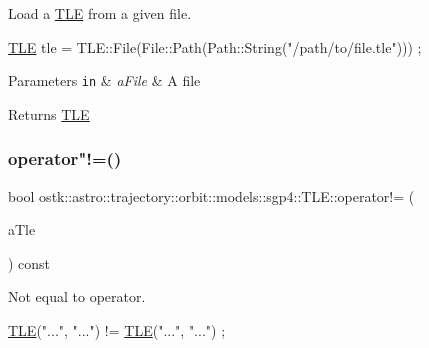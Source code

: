 Load a \hyperlink{classostk_1_1astro_1_1trajectory_1_1orbit_1_1models_1_1sgp4_1_1_t_l_e}{T\+LE} from a given file. 


\begin{DoxyCode}
\hyperlink{classostk_1_1astro_1_1trajectory_1_1orbit_1_1models_1_1sgp4_1_1_t_l_e_a57323db2c24577c2e8ddce79fa776d1e}{TLE} tle = TLE::File(File::Path(Path::String(\textcolor{stringliteral}{"/path/to/file.tle"}))) ;
\end{DoxyCode}



\begin{DoxyParams}[1]{Parameters}
\mbox{\tt in}  & {\em a\+File} & A file \\
\hline
\end{DoxyParams}
\begin{DoxyReturn}{Returns}
\hyperlink{classostk_1_1astro_1_1trajectory_1_1orbit_1_1models_1_1sgp4_1_1_t_l_e}{T\+LE} 
\end{DoxyReturn}
\mbox{\label{classostk_1_1astro_1_1trajectory_1_1orbit_1_1models_1_1sgp4_1_1_t_l_e_a3b15abd9b07fb2a0851b680fe23da8f6}} 
\subsubsection{\texorpdfstring{operator"!=()}{operator!=()}}
{\footnotesize\ttfamily bool ostk\+::astro\+::trajectory\+::orbit\+::models\+::sgp4\+::\+T\+L\+E\+::operator!= (\begin{DoxyParamCaption}\item[{const \hyperlink{classostk_1_1astro_1_1trajectory_1_1orbit_1_1models_1_1sgp4_1_1_t_l_e}{T\+LE} \&}]{a\+Tle }\end{DoxyParamCaption}) const}



Not equal to operator. 


\begin{DoxyCode}
\hyperlink{classostk_1_1astro_1_1trajectory_1_1orbit_1_1models_1_1sgp4_1_1_t_l_e_a57323db2c24577c2e8ddce79fa776d1e}{TLE}(\textcolor{stringliteral}{"..."}, \textcolor{stringliteral}{"..."}) != \hyperlink{classostk_1_1astro_1_1trajectory_1_1orbit_1_1models_1_1sgp4_1_1_t_l_e_a57323db2c24577c2e8ddce79fa776d1e}{TLE}(\textcolor{stringliteral}{"..."}, \textcolor{stringliteral}{"..."}) ;
\end{DoxyCode}



